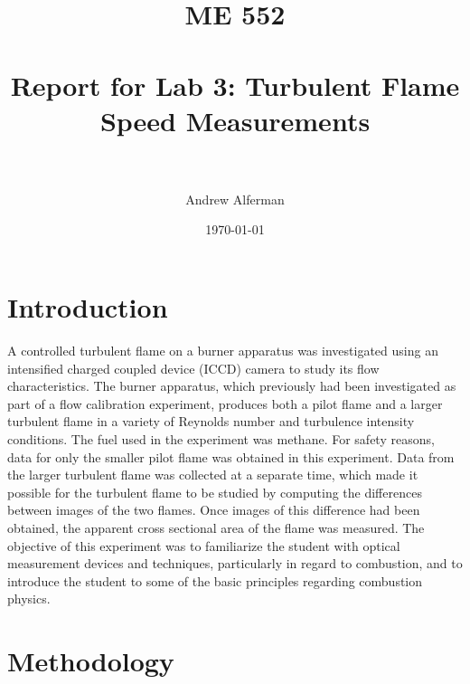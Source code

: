 \documentclass[12pt]{ussci} %
\title{	
\normalfont \normalsize 
\textsc{ME 552} \\ [25pt] %
\horrule{0.5pt} \\[0.4cm] %
\huge Report for Lab 3: Turbulent Flame Speed Measurements \\ %
\horrule{2pt} \\[0.5cm] %
}
\author{Andrew Alferman} %
\date{\normalsize\today} %
\begin{document}

\maketitle %

\section{Introduction}
\label{intro}
A controlled turbulent flame on a burner apparatus was investigated using an intensified charged coupled device (ICCD) camera to study its flow characteristics.  The burner apparatus, which previously had been investigated as part of a flow calibration experiment, produces both a pilot flame and a larger turbulent flame in a variety of Reynolds number and turbulence intensity conditions.  The fuel used in the experiment was methane.  For safety reasons, data for only the smaller pilot flame was obtained in this experiment.  Data from the larger turbulent flame was collected at a separate time, which made it possible for the turbulent flame to be studied by computing the differences between images of the two flames.  Once images of this difference had been obtained, the apparent cross sectional area of the flame was measured.  The objective of this experiment was to familiarize the student with optical measurement devices and techniques, particularly in regard to combustion, and to introduce the student to some of the basic principles regarding combustion physics.


\section{Methodology}
\end{document}
